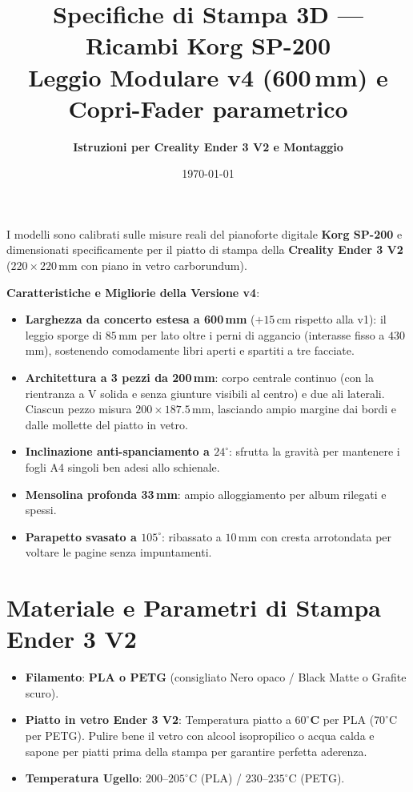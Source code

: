 \documentclass[11pt,a4paper]{article}
\title{\textbf{\Large Specifiche di Stampa 3D — Ricambi Korg SP-200}\\\large Leggio Modulare v4 (600\,mm) e Copri-Fader parametrico}
\author{\textbf{Istruzioni per Creality Ender 3 V2 e Montaggio}}
\date{\today}
\begin{document}
\maketitle

\begin{tcolorbox}[colback=primary!5!white,colframe=primary,title=\textbf{Sintesi del Progetto — Versione v4 per Creality Ender 3 V2}]
I modelli sono calibrati sulle misure reali del pianoforte digitale \textbf{Korg SP-200} e dimensionati specificamente per il piatto di stampa della \textbf{Creality Ender 3 V2} ($220\times 220$\,mm con piano in vetro carborundum).

\textbf{Caratteristiche e Migliorie della Versione v4}:
\begin{itemize}
    \item \textbf{Larghezza da concerto estesa a 600\,mm} ($+15$\,cm rispetto alla v1): il leggio sporge di $85$\,mm per lato oltre i perni di aggancio (interasse fisso a $430$\,mm), sostenendo comodamente libri aperti e spartiti a tre facciate.
    \item \textbf{Architettura a 3 pezzi da 200\,mm}: corpo centrale continuo (con la rientranza a V solida e senza giunture visibili al centro) e due ali laterali. Ciascun pezzo misura $200 \times 187.5$\,mm, lasciando ampio margine dai bordi e dalle mollette del piatto in vetro.
    \item \textbf{Inclinazione anti-spanciamento a $24^\circ$}: sfrutta la gravità per mantenere i fogli A4 singoli ben adesi allo schienale.
    \item \textbf{Mensolina profonda 33\,mm}: ampio alloggiamento per album rilegati e spessi.
    \item \textbf{Parapetto svasato a $105^\circ$}: ribassato a $10$\,mm con cresta arrotondata per voltare le pagine senza impuntamenti.
\end{itemize}
\end{tcolorbox}

\section{Materiale e Parametri di Stampa Ender 3 V2}
\begin{itemize}
    \item \textbf{Filamento}: \textbf{PLA o PETG} (consigliato Nero opaco / Black Matte o Grafite scuro).
    \item \textbf{Piatto in vetro Ender 3 V2}: Temperatura piatto a \textbf{$60^\circ$C} per PLA ($70^\circ$C per PETG). Pulire bene il vetro con alcool isopropilico o acqua calda e sapone per piatti prima della stampa per garantire perfetta aderenza.
    \item \textbf{Temperatura Ugello}: $200\text{--}205^\circ$C (PLA) / $230\text{--}235^\circ$C (PETG).
\end{itemize}
\end{document}
